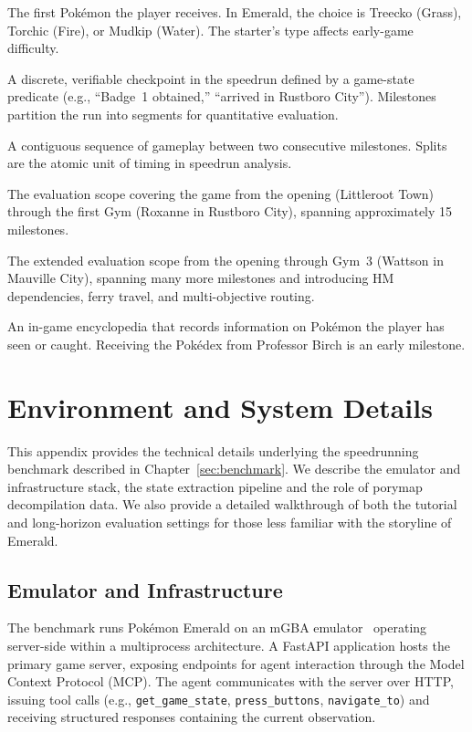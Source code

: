 \begin{description}[style=nextline, leftmargin=2em]
\item[Starter Pok\'{e}mon] The first Pok\'{e}mon the player receives. In Emerald, the choice is Treecko (Grass), Torchic (Fire), or Mudkip (Water). The starter's type affects early-game difficulty.
\item[Milestone] A discrete, verifiable checkpoint in the speedrun defined by a game-state predicate (e.g., ``Badge~1 obtained,'' ``arrived in Rustboro City''). Milestones partition the run into segments for quantitative evaluation.
\item[Split] A contiguous sequence of gameplay between two consecutive milestones. Splits are the atomic unit of timing in speedrun analysis.
\item[Tutorial Setting] The evaluation scope covering the game from the opening (Littleroot Town) through the first Gym (Roxanne in Rustboro City), spanning approximately 15 milestones.
\item[Long-Horizon Setting] The extended evaluation scope from the opening through Gym~3 (Wattson in Mauville City), spanning many more milestones and introducing HM dependencies, ferry travel, and multi-objective routing.
\item[Pok\'{e}dex] An in-game encyclopedia that records information on Pok\'{e}mon the player has seen or caught. Receiving the Pok\'{e}dex from Professor Birch is an early milestone.
\end{description}

\section{Environment and System Details}\label{sec:appendix_environment}

This appendix provides the technical details underlying the speedrunning benchmark described in Chapter~\ref{sec:benchmark}. We describe the emulator and infrastructure stack, the state extraction pipeline and the role of porymap decompilation data. We also provide a detailed walkthrough of both the tutorial and long-horizon evaluation settings for those less familiar with the storyline of \pokemon{} Emerald.

\subsection{Emulator and Infrastructure}\label{sec:appendix_infrastructure}

The benchmark runs Pok\'{e}mon Emerald on an mGBA emulator~\citep{huderlem2025porymap} operating server-side within a multiprocess architecture. A FastAPI application hosts the primary game server, exposing endpoints for agent interaction through the Model Context Protocol (MCP). The agent communicates with the server over HTTP, issuing tool calls (e.g., \texttt{get\_game\_state}, \texttt{press\_buttons}, \texttt{navigate\_to}) and receiving structured responses containing the current observation.


